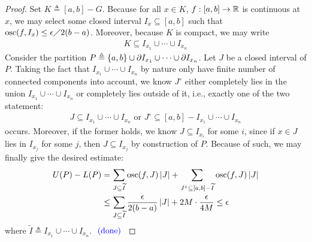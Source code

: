 \documentclass{report}
\begin{document}
\begin{proof}
Set $K\triangleq [a,b]-G$. Because for all $x \in K$, $f:[a,b]\rightarrow \mathbb{R}$ is continuous at $x$, we may select some closed interval $I_x\subseteq [a,b]$ such that $\operatorname{osc}(f,I_x)\leq \epsilon \diagup 2(b-a)$. Moreover, because $K$ is compact, we may write 
\begin{align*}
K \subseteq I_{x_1} \cup \cdots \cup  I_{x_n}
\end{align*}
Consider the partition $P\triangleq  \left\{ a,b \right\}\cup \partial I_{x_1}\cup  \cdots \cup  \partial I_{x_n}$. Let $J$ be a closed interval of $P$. Taking the fact that $I_{x_1}\cup  \cdots \cup  I_{x_n}$ by nature only have finite number of connected components into account, we know $J^\circ $ either completely lies in the union $I_{x_1}\cup \cdots \cup  I_{x_n}$ or completely lies outside of it, i.e., exactly one of the two statement:  
\begin{align*}
J \subseteq I_{x_1} \cup  \cdots \cup  I_{x_n}\text{ or }J^{\circ } \subseteq [a,b]- I_{x_1} \cup  \cdots \cup  I_{x_n} 
\end{align*}
occurs. Moreover, if the former holds, we know $J \subseteq I_{x_i}$ for some $i$, since if $x \in J$ lies in $I_{x_j}$ for some $j$, then $J \subseteq I_{x_j}$ by construction of $P$. Because of such, we may finally give the desired estimate: 
\begin{align*}
U(P)- L(P) &= \sum_{J \subseteq \widetilde{I}} \operatorname{osc}(f,J) \left|J\right| + \sum_{J^{\circ }\subseteq [a,b]- \widetilde{I}  } \operatorname{osc}(f,J)\left|J\right|\\
&\leq \sum_{J \subseteq \widetilde{I} } \frac{\epsilon }{2(b-a)}\left|J\right| +  2M \cdot \frac{\epsilon }{4M} \leq \epsilon    
\end{align*}
where $\tilde{I}\triangleq I_{x_1}\cup  \cdots \cup  I_{x_n}$. $\textcolor{blue}{\text{ (done) }}$ 
\end{proof}
\end{document}
